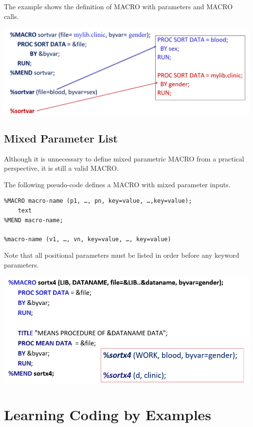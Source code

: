 \documentclass[
]{book}
\begin{document}
The example shows the definition of MACRO with parameters and MACRO calls.

\begin{center}\includegraphics[width=0.8\linewidth]{img14/w14-parameterMACROdefANDcall} \end{center}

\hypertarget{mixed-parameter-list}{%
\subsection{Mixed Parameter List}\label{mixed-parameter-list}}

Although it is unnecessary to define mixed parametric MACRO from a practical perspective, it is still a valid MACRO.

The following pseudo-code defines a MACRO with mixed parameter inputs.

\begin{verbatim}
%MACRO macro-name (p1, …, pn, key=value, …,key=value);
    text
%MEND macro-name;

%macro-name (v1, …, vn, key=value, …, key=value)
\end{verbatim}

Note that all positional parameters must be listed in order before any keyword parameters.

\begin{center}\includegraphics[width=0.8\linewidth]{img14/w14-mixParameterMacroDefCall} \end{center}

\hypertarget{learning-coding-by-examples-10}{%
\section{Learning Coding by Examples}\label{learning-coding-by-examples-10}}
\end{document}
